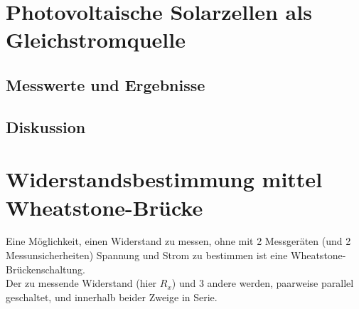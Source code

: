 \documentclass[12pt,a4paper]{article}
\begin{document}
\pagebreak
\setlength{\columnsep}{20pt}
\begin{multicols}{2}



%			
%


\section{Photovoltaische Solarzellen als Gleichstromquelle}
\subsection{Messwerte und Ergebnisse}

\subsection{Diskussion}
\section{Widerstandsbestimmung mittel Wheatstone-Brücke}

Eine Möglichkeit, einen Widerstand zu messen, ohne mit 2 Messgeräten (und 2 Messunsicherheiten) Spannung und Strom zu bestimmen ist eine Wheatstone-Brückenschaltung.
\\
Der zu messende Widerstand (hier $R_x$) und 3 andere werden, paarweise parallel geschaltet, und innerhalb beider Zweige in Serie. 


\end{multicols}
\end{document}
